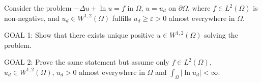 \documentclass[12pt]{article}					%
\begin{document}
	\begin{priklad}
		Consider the problem $-Δu + \ln u = f$ in $Ω$, $u = u_d$ on $\partial Ω$, where $f \in L^2(Ω)$ is non-negative, and $u_d \in W^{1, 2}(Ω)$ fulfills $u_d ≥ ε > 0$ almost everywhere in $Ω$.

		GOAL 1: Show that there exists unique positive $u \in W^{1,2}(Ω)$ solving the problem.

		\begin{dukazin}
			
		\end{dukazin}

		GOAL 2: Prove the same statement but assume only $f \in L^2(Ω)$, $u_d \in W^{1, 2}(Ω)$, $u_d > 0$ almost everywhere in $Ω$ and $\int_Ω | \ln u_d| < ∞$.

		\begin{dukazin}
			
		\end{dukazin}
	\end{priklad}
\end{document}
